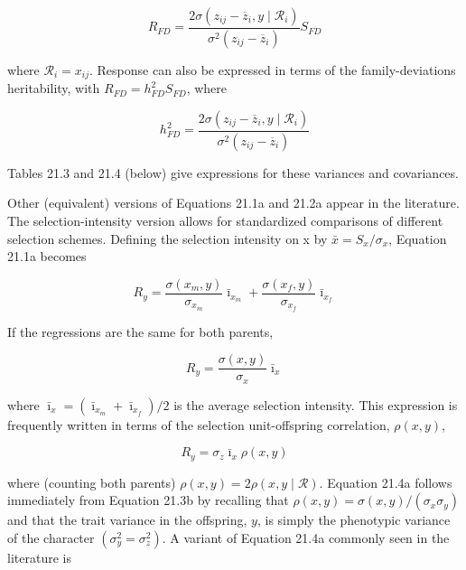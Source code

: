 \documentclass{article}
\begin{document}
\begin{equation}
R_{FD}=\frac{2\sigma(z_{ij}-\overline{z}_{i},y\mid\mathcal{R}_{i})}{\sigma^{2}(z_{ij}-\overline{z}_{i})}S_{FD}
\end{equation}

where  $ \mathcal{R}_i = x_{ij} $. Response can also be expressed in terms of the family-deviations heritability, with  $ R_{FD} = h_{FD}^2 S_{FD} $, where

\begin{equation}
h_{FD}^{2}=\frac{2\sigma(z_{ij}-\overline{z}_{i},y\mid\mathcal{R}_{i})}{\sigma^{2}(z_{ij}-\overline{z}_{i})}
\end{equation}

Tables 21.3 and 21.4 (below) give expressions for these variances and covariances.

Other (equivalent) versions of Equations 21.1a and 21.2a appear in the literature. The selection-intensity version allows for standardized comparisons of different selection schemes. Defining the selection intensity on x by  $ \bar{x} = S_x / \sigma_x $, Equation 21.1a becomes

\begin{equation}
R_{y}=\frac{\sigma(x_{m},y)}{\sigma_{x_{m}}}\bar{\imath}_{x_{m}}+\frac{\sigma(x_{f},y)}{\sigma_{x_{f}}}\bar{\imath}_{x_{f}}
\tag{21.3a}
\label{eq:21_3a}
\end{equation}

If the regressions are the same for both parents,

\begin{equation}
R_{y}=\frac{\sigma(x,y)}{\sigma_{x}}\bar{\imath}_{x}
\tag{21.3b}
\label{eq:21_3b}
\end{equation}

where  $ \bar{\imath}_{x} = (\bar{\imath}_{x_{m}} + \bar{\imath}_{x_{f}})/2 $ is the average selection intensity. This expression is frequently written in terms of the selection unit-offspring correlation,  $ \rho(x, y) $,

\begin{equation}
R_{y}=\sigma_{z}\bar{\imath}_{x}\rho(x,y)
\tag{21.4a}
\label{eq:21_4a}
\end{equation}

where (counting both parents)  $ \rho(x, y) = 2\rho(x, y \mid \mathcal{R}) $. Equation 21.4a follows immediately from Equation 21.3b by recalling that  $ \rho(x, y) = \sigma(x, y)/(\sigma_x \sigma_y) $ and that the trait variance in the offspring,  $ y $, is simply the phenotypic variance of the character  $ (\sigma_y^2 = \sigma_z^2) $. A variant of Equation 21.4a commonly seen in the literature is
\end{document}
